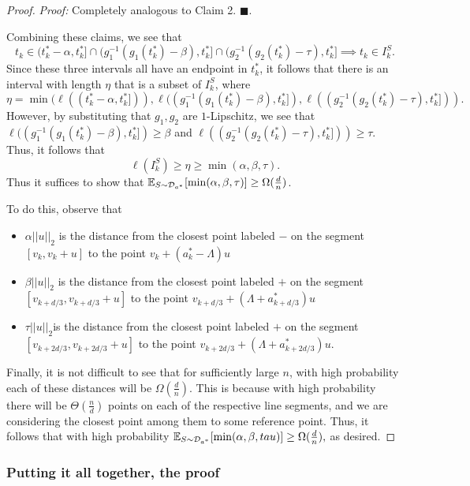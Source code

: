 \begin{proof}
\textit{Proof: }  Completely analogous to Claim 2. $\blacksquare$.

Combining these claims, we see that $$t_k \in (t_k^* - \alpha, t_k^*] \cap (g_1^{-1}(g_1(t_k^*) - \beta), t_k^*] \cap  (g_2^{-1}(g_2(t_k^*) - \tau), t_k^*] \implies t_k \in I_k^S.$$ Since these three intervals all have an endpoint in $t_k^*$, it follows that there is an interval with length $\eta$ that is a subset of $I_k^S$, where $$\eta = \min(\ell((t_k^* - \alpha, t_k^*])), \ell((g_1^{-1}(g_1(t_k^*) - \beta), t_k^*]), \ell((g_2^{-1}(g_2(t_k^*) - \tau), t_k^*])).$$ However, by substituting that $g_1, g_2$ are $1$-Lipschitz, we see that $\ell((g_1^{-1}(g_1(t_k^*) - \beta), t_k^*]) \geq \beta$ and $\ell((g_2^{-1}(g_2(t_k^*) - \tau), t_k^*])) \geq \tau$. Thus, it follows that $$\ell(I_k^S) \geq \eta \geq \min(\alpha, \beta, \tau).$$ Thus it suffices to show that ${\mathbb E}_{S \sim {\mathcal D}_{a^*}}[\min(\alpha, \beta, \tau)] \geq \Omega(\frac{d}{n})$. 

To do this, observe that
\begin{itemize}
	\item $\alpha||u||_2$ is the distance from the closest point labeled $-$ on the segment $[v_k, v_k + u]$ to the point $v_k + (a_k^* - \Lambda)u$
	\item  $\beta||u||_2$ is the distance from the closest point labeled $+$ on the segment $[v_{k+d/3}, v_{k+d/3} + u]$ to the point $v_{k+d/3} + (\Lambda + a_{k+d/3}^*)u$
	\item $\tau||u||_2$is the distance from the closest point labeled $+$ on the segment $[v_{k + 2d/3}, v_{k + 2d/3} + u]$ to the point $v_{k+2d/3} + (\Lambda + a_{k+2d/3}^*)u$.
\end{itemize}

Finally, it is not difficult to see that for sufficiently large $n$, with high probability each of these distances will be $\Omega(\frac{d}{n})$. This is because with high probability there will be $\Theta(\frac{n}{d})$ points on each of the respective line segments, and we are considering the closest point among them to some reference point. Thus, it follows that with high probability ${\mathbb E}_{S \sim {\mathcal D}_{a^*}}[\min(\alpha, \beta, tau)] \geq \Omega(\frac{d}{n}),$ as desired.
\end{proof}

\subsubsection{Putting it all together, the proof}\label{subsubsec:proof}

